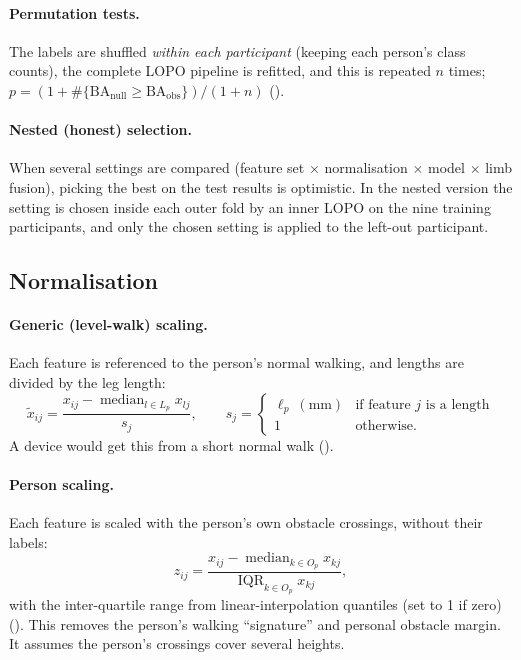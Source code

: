 \paragraph{Permutation tests.} The labels are shuffled \emph{within each participant} (keeping each person's class counts),
the complete LOPO pipeline is refitted, and this is repeated $n$ times; $p = (1 + \#\{\mathrm{BA}_{\text{null}} \geq
\mathrm{BA}_{\text{obs}}\}) / (1 + n)$ ().

\paragraph{Nested (honest) selection.} When several settings are compared (feature set $\times$ normalisation $\times$
model $\times$ limb fusion), picking the best on the test results is optimistic. In the nested version the setting is chosen
inside each outer fold by an inner LOPO on the nine training participants, and only the chosen setting is applied to the
left-out participant.

\subsection{Normalisation}
\label{sec:norm}

\paragraph{Generic (level-walk) scaling.} Each feature is referenced to the person's normal walking, and lengths are
divided by the leg length:
\begin{equation}
\tilde x_{ij} = \frac{x_{ij} - \operatorname{median}_{l \in L_p} x_{lj}}{s_j}, \qquad s_j = \begin{cases} \ell_p\ (\text{mm}) & \text{if feature } j \text{ is a length}\\ 1 & \text{otherwise.}\end{cases}
\end{equation}
A device would get this from a short normal walk ().

\paragraph{Person scaling.} Each feature is scaled with the person's own obstacle crossings, without their labels:
\begin{equation}
z_{ij} = \frac{x_{ij} - \operatorname{median}_{k \in O_p} x_{kj}}{\operatorname{IQR}_{k \in O_p} x_{kj}},
\end{equation}
with the inter-quartile range from linear-interpolation quantiles (set to 1 if zero) (). This removes
the person's walking ``signature'' and personal obstacle margin. It assumes the person's crossings cover several heights.

